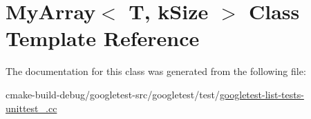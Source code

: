 \hypertarget{classMyArray}{}\section{My\+Array$<$ T, k\+Size $>$ Class Template Reference}
\label{classMyArray}


The documentation for this class was generated from the following file\+:\begin{DoxyCompactItemize}
\item 
cmake-\/build-\/debug/googletest-\/src/googletest/test/\mbox{\hyperlink{googletest-list-tests-unittest___8cc}{googletest-\/list-\/tests-\/unittest\+\_\+.\+cc}}\end{DoxyCompactItemize}
